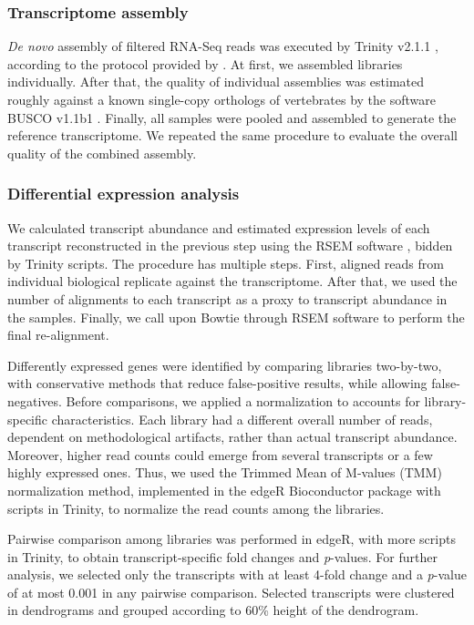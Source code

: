 \subsubsection{Transcriptome assembly}

\textit{De novo} assembly of filtered RNA-Seq reads was executed by Trinity v2.1.1 \citep{grabherr2011trinity}, according to the protocol provided by \citep{haas2013novo}. At first, we assembled libraries individually. After that, the quality of individual assemblies was estimated roughly against a known single-copy orthologs of vertebrates by the software BUSCO v1.1b1 \citep{simao2015busco}. Finally, all samples were pooled and assembled to generate the reference transcriptome. We repeated the same procedure to evaluate the overall quality of the combined assembly.

\subsubsection{Differential expression analysis}

We calculated transcript abundance and estimated expression levels of each transcript reconstructed in the previous step using the RSEM software \citep{li2011rsem}, bidden by Trinity scripts. The procedure has multiple steps. First, aligned reads from individual biological replicate against the transcriptome. After that, we used the number of alignments to each transcript as a proxy to transcript abundance in the samples. Finally, we call upon Bowtie \citep{langmead2009ultrafast} through RSEM software to perform the final re-alignment.

Differently expressed genes were identified by comparing libraries two-by-two, with conservative methods that reduce false-positive results, while allowing false-negatives. Before comparisons, we applied a normalization to accounts for library-specific characteristics. Each library had a different overall number of reads, dependent on methodological artifacts, rather than actual transcript abundance. Moreover, higher read counts could emerge from several transcripts or a few highly expressed ones. Thus, we used the Trimmed Mean of M-values (TMM) normalization method, implemented in the edgeR Bioconductor package \citep{robinson2010edger} with scripts in Trinity, to normalize the read counts among the libraries.

Pairwise comparison among libraries was performed in edgeR, with more scripts in Trinity, to obtain transcript-specific fold changes and \textit{p}-values. For further analysis, we selected only the transcripts with at least 4-fold change and a \textit{p}-value of at most 0.001 in any pairwise comparison. Selected transcripts were clustered in dendrograms and grouped according to 60\% height of the dendrogram.

